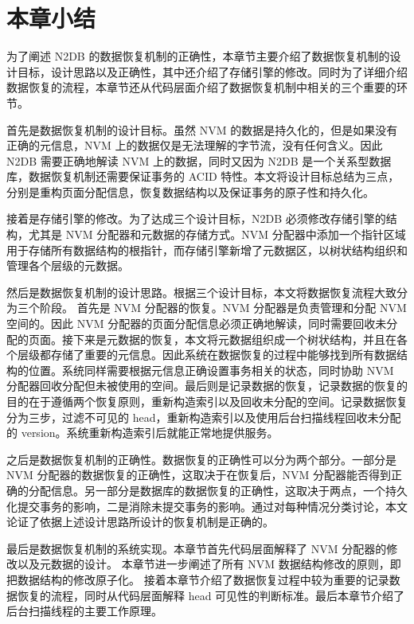 \section{本章小结}

为了阐述 N2DB 的数据恢复机制的正确性，本章节主要介绍了数据恢复机制的设计目标，设计思路以及正确性，其中还介绍了存储引擎的修改。同时为了详细介绍数据恢复的流程，本章节还从代码层面介绍了数据恢复机制中相关的三个重要的环节。

首先是数据恢复机制的设计目标。虽然 NVM 的数据是持久化的，但是如果没有正确的元信息，NVM 上的数据仅是无法理解的字节流，没有任何含义。因此 N2DB 需要正确地解读 NVM 上的数据，同时又因为 N2DB 是一个关系型数据库，数据恢复机制还需要保证事务的 ACID 特性。本文将设计目标总结为三点，分别是重构页面分配信息，恢复数据结构以及保证事务的原子性和持久化。

接着是存储引擎的修改。为了达成三个设计目标，N2DB 必须修改存储引擎的结构，尤其是 NVM 分配器和元数据的存储方式。NVM 分配器中添加一个指针区域用于存储所有数据结构的根指针，而存储引擎新增了元数据区，以树状结构组织和管理各个层级的元数据。

然后是数据恢复机制的设计思路。根据三个设计目标，本文将数据恢复流程大致分为三个阶段。
首先是 NVM 分配器的恢复。NVM 分配器是负责管理和分配 NVM 空间的。因此 NVM 分配器的页面分配信息必须正确地解读，同时需要回收未分配的页面。接下来是元数据的恢复，本文将元数据组织成一个树状结构，并且在各个层级都存储了重要的元信息。因此系统在数据恢复的过程中能够找到所有数据结构的位置。系统同样需要根据元信息正确设置事务相关的状态，同时协助 NVM 分配器回收分配但未被使用的空间。最后则是记录数据的恢复，记录数据的恢复的目的在于遵循两个恢复原则，重新构造索引以及回收未分配的空间。记录数据恢复分为三步，过滤不可见的 head，重新构造索引以及使用后台扫描线程回收未分配的 version。系统重新构造索引后就能正常地提供服务。

之后是数据恢复机制的正确性。数据恢复的正确性可以分为两个部分。一部分是 NVM 分配器的数据恢复的正确性，这取决于在恢复后，NVM 分配器能否得到正确的分配信息。另一部分是数据库的数据恢复的正确性，这取决于两点，一个持久化提交事务的影响，二是消除未提交事务的影响。通过对每种情况分类讨论，本文论证了依据上述设计思路所设计的恢复机制是正确的。

最后是数据恢复机制的系统实现。本章节首先代码层面解释了 NVM 分配器的修改以及元数据的设计。
本章节进一步阐述了所有 NVM 数据结构修改的原则，即把数据结构的修改原子化。
接着本章节介绍了数据恢复过程中较为重要的记录数据恢复的流程，同时从代码层面解释 head 可见性的判断标准。最后本章节介绍了后台扫描线程的主要工作原理。


